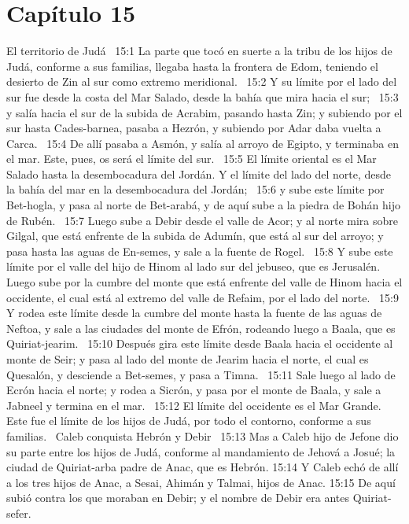 \section*{Capítulo 15 }
El territorio de Judá  
15:1 La parte que tocó en suerte a la tribu de los hijos de Judá, conforme a sus familias, llegaba hasta la frontera de Edom, teniendo el desierto de Zin al sur como extremo meridional.  
15:2 Y su límite por el lado del sur fue desde la costa del Mar Salado, desde la bahía que mira hacia el sur;  
15:3 y salía hacia el sur de la subida de Acrabim, pasando hasta Zin; y subiendo por el sur hasta Cades-barnea, pasaba a Hezrón, y subiendo por Adar daba vuelta a Carca.  
15:4 De allí pasaba a Asmón, y salía al arroyo de Egipto, y terminaba en el mar. Este, pues, os será el límite del sur.  
15:5 El límite oriental es el Mar Salado hasta la desembocadura del Jordán. Y el límite del lado del norte, desde la bahía del mar en la desembocadura del Jordán;  
15:6 y sube este límite por Bet-hogla, y pasa al norte de Bet-arabá, y de aquí sube a la piedra de Bohán hijo de Rubén.  
15:7 Luego sube a Debir desde el valle de Acor; y al norte mira sobre Gilgal, que está enfrente de la subida de Adumín, que está al sur del arroyo; y pasa hasta las aguas de En-semes, y sale a la fuente de Rogel.  
15:8 Y sube este límite por el valle del hijo de Hinom al lado sur del jebuseo, que es Jerusalén. Luego sube por la cumbre del monte que está enfrente del valle de Hinom hacia el occidente, el cual está al extremo del valle de Refaim, por el lado del norte.  
15:9 Y rodea este límite desde la cumbre del monte hasta la fuente de las aguas de Neftoa, y sale a las ciudades del monte de Efrón, rodeando luego a Baala, que es Quiriat-jearim.  
15:10 Después gira este límite desde Baala hacia el occidente al monte de Seir; y pasa al lado del monte de Jearim hacia el norte, el cual es Quesalón, y desciende a Bet-semes, y pasa a Timna.  
15:11 Sale luego al lado de Ecrón hacia el norte; y rodea a Sicrón, y pasa por el monte de Baala, y sale a Jabneel y termina en el mar.  
15:12 El límite del occidente es el Mar Grande. Este fue el límite de los hijos de Judá, por todo el contorno, conforme a sus familias.  
Caleb conquista Hebrón y Debir   
15:13 Mas a Caleb hijo de Jefone dio su parte entre los hijos de Judá, conforme al mandamiento de Jehová a Josué; la ciudad de Quiriat-arba padre de Anac, que es Hebrón. 
15:14 Y Caleb echó de allí a los tres hijos de Anac, a Sesai, Ahimán y Talmai, hijos de Anac. 
15:15 De aquí subió contra los que moraban en Debir; y el nombre de Debir era antes Quiriat-sefer.  
